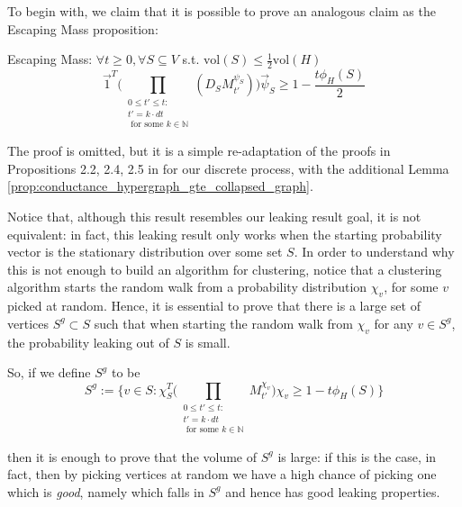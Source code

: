 \documentclass[../main.tex]{subfiles}
\begin{document}
    To begin with, we claim that it is possible to prove an analogous claim as the Escaping Mass proposition:
    
    \begin{proposition}{Escaping Mass:}
    \label{prop:escaping_mass}
        $\forall t \geq 0, \forall S\subseteq V$ s.t. $\text{vol}(S) \leq \frac{1}{2}\text{vol}(H)$
        \begin{equation}
            \vec{1}^T\bigg(\prod_{\substack{0 \leq t'\leq t:\\ t' = k\cdot dt\\ \text{ for some }k\in \mathbb{N}}}(D_S M_{t'}^{\psi_S})\bigg) \vec{\psi}_S \geq 1 - \frac{t \phi_H(S)}{2}
        \end{equation}
    \end{proposition}
    
    The proof is omitted, but it is a simple re-adaptation of the proofs in Propositions 2.2, 2.4, 2.5 in \cite{SpielmanClustering} for our discrete process, with the additional Lemma \ref{prop:conductance_hypergraph_gte_collapsed_graph}.
    
    Notice that, although this result resembles our leaking result goal, it is not equivalent: in fact, this leaking result only works when the starting probability vector is the stationary distribution over some set $S$. In order to understand why this is not enough to build an algorithm for clustering, notice that a clustering algorithm starts the random walk from a probability distribution $\chi_v$, for some $v$ picked at random. Hence, it is essential to prove that there is a large set of vertices $S^g \subset S$ such that when starting the random walk from $\chi_v$ for any $v\in S^g$, the probability leaking out of $S$ is small.
    
    So, if we define $S^g$ to be
    \begin{equation}
        S^g := \bigg\{v \in S : \chi_{S}^T \bigg(\prod_{\substack{0 \leq t'\leq t:\\ t' = k\cdot dt\\ \text{ for some }k\in \mathbb{N}}} M_{t'}^{\chi_v} \bigg) \chi_v \geq 1 - t \phi_H(S) \bigg\}
    \end{equation}
    
    then it is enough to prove that the volume of $S^g$ is large: if this is the case, in fact, then by picking vertices at random we have a high chance of picking one which is \textit{good}, namely which falls in $S^g$ and hence has good leaking properties.
    
\end{document}

